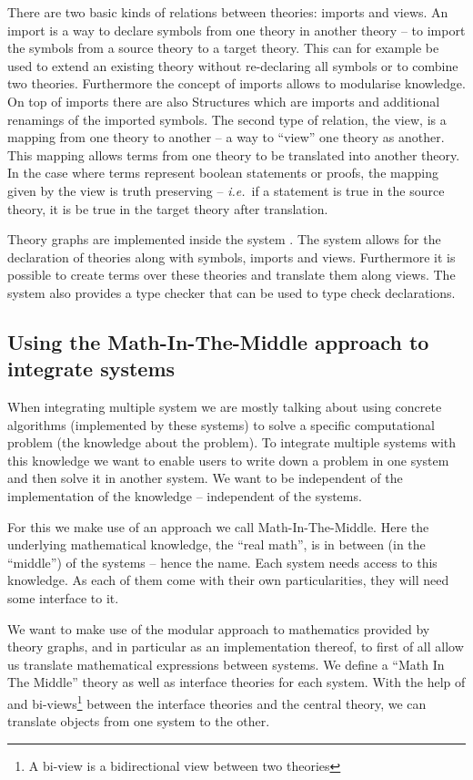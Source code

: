 There are two basic kinds of relations between theories: imports and views. An import is a
way to declare symbols from one theory in another theory -- to import the symbols from a
source theory to a target theory. This can for example be used to extend an existing
theory without re-declaring all symbols or to combine two theories. Furthermore the
concept of imports allows to modularise knowledge. On top of imports there are also
Structures which are imports and additional renamings of the imported symbols. The second
type of relation, the view, is a mapping from one theory to another -- a way to ``view''
one theory as another. This mapping allows terms from one theory to be translated into
another theory. In the case where terms represent boolean statements or proofs, the
mapping given by the view is truth preserving -- \emph{i.e.}~if a statement is true in the
source theory, it is be true in the target theory after translation.

Theory graphs are implemented inside the \MMT system \cite{RabKoh:WSMSML13}. The system
allows for the declaration of theories along with symbols, imports and views. Furthermore
it is possible to create terms over these theories and translate them along views. The
\MMT system also provides a type checker that can be used to type check declarations.

\subsection{Using the Math-In-The-Middle approach to integrate systems}\label{sec:mitm}

When integrating multiple system we are mostly talking about using concrete algorithms
(implemented by these systems) to solve a specific computational problem (the knowledge
about the problem). To integrate multiple systems with this knowledge we want to enable
users to write down a problem in one system and then solve it in another system. We want
to be independent of the implementation of the knowledge -- independent of the systems.

For this we make use of an approach we call Math-In-The-Middle. Here the underlying
mathematical knowledge, the ``real math'', is in between (in the ``middle'') of the
systems -- hence the name. Each system needs access to this knowledge. As each of them
come with their own particularities, they will need some interface to it.

We want to make use of the modular approach to mathematics provided by theory graphs, and
in particular \MMT as an implementation thereof, to first of all allow us translate
mathematical expressions between systems. We define a ``Math In The Middle'' theory as
well as interface theories for each system. With the help of \MMT and bi-views\footnote{A
  bi-view is a bidirectional view between two theories} between the interface theories and
the central theory, we can translate objects from one system to the other.

